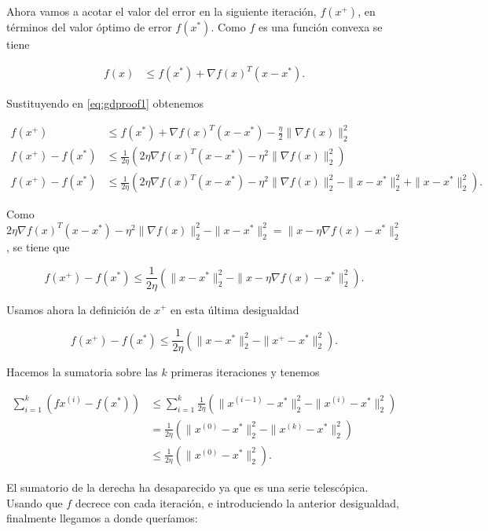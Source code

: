 Ahora vamos a acotar el valor del error en la siguiente iteración, $f(x^+)$, en términos del valor óptimo de error $f(x^*)$. Como $f$ es una función convexa se tiene

\begin{align*}
    f(x) &\leq f(x^*) + \nabla f(x)^T (x-x^*).
\end{align*}

Sustituyendo en \ref{eq:gdproof1} obtenemos

\begin{align*}
    f(x^+) &\leq f(x^*) + \nabla f(x)^T (x-x^*) - \frac{\eta}{2} \| \nabla f(x) \| ^2_2 \\ 
    f(x^+) - f(x^*) &\leq  \frac{1}{2\eta}  \left ( 2 \eta \nabla f(x)^T (x-x^*) - \eta ^2 \| \nabla f(x) \| ^2_2 \right ) \\ 
    f(x^+) - f(x^*) &\leq  \frac{1}{2\eta}  \left ( 2 \eta \nabla f(x)^T (x-x^*) - \eta ^2 \| \nabla f(x) \| ^2_2 - \| x - x^* \|^2_2 + \| x - x^* \|^2_2 \right ).    
\end{align*}

Como $  2 \eta \nabla f(x)^T (x-x^*) - \eta ^2 \| \nabla f(x) \| ^2_2 - \| x - x^* \|^2_2 = \| x - \eta \nabla f(x) - x^* \|^2_2 $, se tiene que

$$ f(x^+) - f(x^*) \leq  \frac{1}{2\eta}  \left ( \| x - x^* \|^2_2 -  \| x - \eta \nabla f(x) - x^* \|^2_2 \right ) .$$

Usamos ahora la definición de $x^+$ en esta última desigualdad

$$ f(x^+) - f(x^*) \leq  \frac{1}{2\eta}  \left ( \| x - x^* \|^2_2 -  \| x^+ - x^* \|^2_2 \right ) .$$

Hacemos la sumatoria sobre las $k$ primeras iteraciones y tenemos

\begin{align*}
    \sum^k_{i=1} \left ( fx^{(i)} - f(x^*) \right ) &\leq \sum^k_{i=1} \frac{1}{2\eta}  \left ( \| x^{(i-1)} - x^* \|^2_2 -  \| x^{(i)} - x^* \|^2_2 \right ) \\ 
    &=\frac{1}{2\eta}  \left ( \| x^{(0)} - x^* \|^2_2 -  \| x^{(k)} - x^* \|^2_2 \right ) \\ 
    &\leq \frac{1}{2\eta}  \left ( \| x^{(0)} - x^* \|^2_2 \right ). 
\end{align*}

El sumatorio de la derecha ha desaparecido ya que es una serie telescópica. Usando que $f$ decrece con cada iteración, e introduciendo la anterior desigualdad, finalmente llegamos a donde queríamos:

